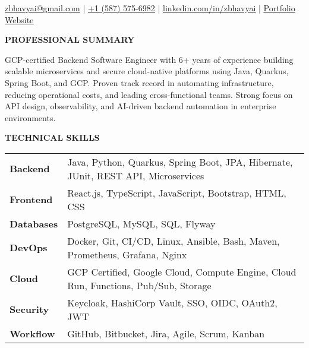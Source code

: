 \documentclass[a4paper]{article}
\newcommand{\header} [1] {
    \vspace{6pt}
    {\hspace*{-18pt} \textcolor{Accent}{\large\textbf{\MakeUppercase{#1}}}}
    \vspace{-7pt} \\
    {\color{Accent}\hspace*{-18pt} \hrulefill \hspace*{-7pt}}
}
\begin{document}
\begin{center}
   {}
\end{center}
\vspace{-10pt}

\begin{center}
    \href{mailto:zbhavyai@gmail.com}{\uline{zbhavyai@gmail.com}} \quad|\quad
    \href{tel:+15875756982}{\uline{+1 (587) 575-6982}} \quad|\quad
    \href{https://linkedin.com/in/zbhavyai}{\uline{linkedin.com/in/zbhavyai}} \quad|\quad
    \href{https://zbhavyai.github.io}{\uline{Portfolio Website}}
\end{center}


\header{Professional Summary}

\vspace{-8pt}
\begin{justify}
{\fontsize{9.0pt}{11pt}\selectfont GCP-certified Backend Software Engineer with 6+ years of experience building scalable microservices and secure cloud-native platforms using Java, Quarkus, Spring Boot, and GCP. Proven track record in automating infrastructure, reducing operational costs, and leading cross-functional teams. Strong focus on API design, observability, and AI-driven backend automation in enterprise environments.}
\end{justify}
\vspace{-4pt}


\header{Technical Skills}

\vspace{2pt}
{\fontsize{9.0pt}{11pt}\selectfont
\begin{tabular}{ l l }
    \textbf{Backend}    & Java, Python, Quarkus, Spring Boot, JPA, Hibernate, JUnit, REST API, Microservices    \\
    \textbf{Frontend}   & React.js, TypeScript, JavaScript, Bootstrap, HTML, CSS                                \\
    \textbf{Databases}  & PostgreSQL, MySQL, SQL, Flyway                                                        \\
    \textbf{DevOps}     & Docker, Git, CI/CD, Linux, Ansible, Bash, Maven, Prometheus, Grafana, Nginx           \\
    \textbf{Cloud}      & GCP Certified, Google Cloud, Compute Engine, Cloud Run, Functions, Pub/Sub, Storage   \\
    \textbf{Security}   & Keycloak, HashiCorp Vault, SSO, OIDC, OAuth2, JWT                                     \\
    \textbf{Workflow}   & GitHub, Bitbucket, Jira, Agile, Scrum, Kanban                                         \\
\end{tabular}
}
\end{document}
